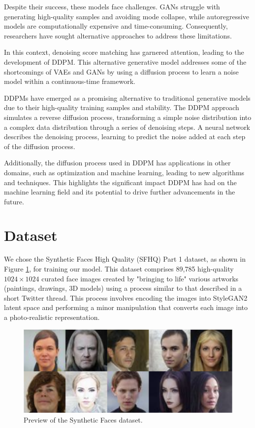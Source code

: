 \documentclass[letterpaper]{article} %
\begin{document}
Despite their success, these models face challenges. GANs struggle with generating high-quality samples and avoiding mode collapse, while autoregressive models are computationally expensive and time-consuming. Consequently, researchers have sought alternative approaches to address these limitations.

In this context, denoising score matching has garnered attention, leading to the development of DDPM. This alternative generative model addresses some of the shortcomings of VAEs and GANs by using a diffusion process to learn a noise model within a continuous-time framework.

DDPMs have emerged as a promising alternative to traditional generative models due to their high-quality training samples and stability. The DDPM approach simulates a reverse diffusion process, transforming a simple noise distribution into a complex data distribution through a series of denoising steps. A neural network describes the denoising process, learning to predict the noise added at each step of the diffusion process.

Additionally, the diffusion process used in DDPM has applications in other domains, such as optimization and machine learning, leading to new algorithms and techniques. This highlights the significant impact DDPM has had on the machine learning field and its potential to drive further advancements in the future.

\section{Dataset}
We chose the Synthetic Faces High Quality (SFHQ) Part 1 dataset, as shown in Figure \ref{fig:figure5}, for training our model. This dataset comprises 89,785 high-quality $1024 \times 1024$ curated face images created by "bringing to life" various artworks (paintings, drawings, 3D models) using a process similar to that described in a short Twitter thread. This process involves encoding the images into StyleGAN2 latent space and performing a minor manipulation that converts each image into a photo-realistic representation.

\begin{figure}[htbp]
\centering
\includegraphics[width=0.88\linewidth]{f5.png} %
\caption{Preview of the Synthetic Faces dataset.}
\label{fig:figure5}
\end{figure}
\end{document}
